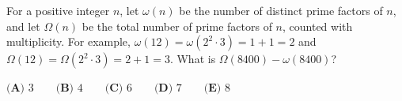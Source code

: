 For a positive integer $n$, let $\omega(n)$ be the number of distinct prime factors of $n$, and let $\Omega(n)$ be the total number of prime factors of $n$, counted with multiplicity. For example, $\omega(12)=\omega\left(2^2\cdot3\right)=1+1=2$ and $\Omega(12)=\Omega\left(2^2\cdot3\right)=2+1=3$. What is $\Omega(8400)-\omega(8400)$?

$\textbf{(A) }3\qquad\textbf{(B) }4\qquad\textbf{(C) }6\qquad\textbf{(D) }7\qquad\textbf{(E) }8$

